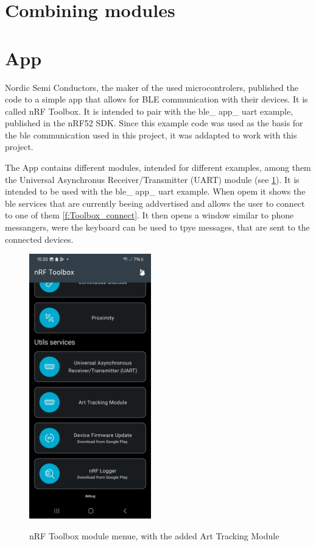 \section{Combining modules}
\label{ss:combination}


\section{App}
\label{s:app}
Nordic Semi Conductors, the maker of the used microcontrolers, published the code to a simple app that allows for BLE communication with their devices.
It is called nRF Toolbox.
It is intended to pair with the ble\_ app\_ uart example, published in the nRF52 SDK.
Since this example code was used as the basis for the ble communication used in this project, it was addapted to work with this project.


The App contains different modules, intended for different examples, among them the Universal Asynchronus Receiver/Transmitter (UART) module (see \ref{f:Toolbox_modules}).
It is intended to be used with the ble\_ app\_ uart example.
When opem it shows the ble services that are currently beeing addvertised and allows the user to connect to one of them \ref{f:Toolbox_connect}.
It then opens a window similar to phone messangers, were the keyboard can be used to tpye messages, that are sent to the connected devices.

\begin{figure}[ht!]
\centering
 \caption{nRF Toolbox module menue, with the added Art Tracking Module}
\includegraphics[width=200px]{graphics/nRF_toolbox_modules.jpg}
\label{f:Toolbox_modules}
\end{figure}

